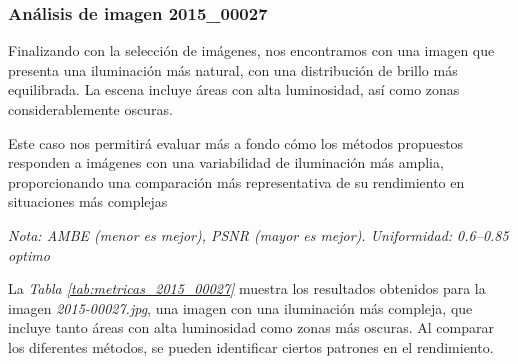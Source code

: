 \documentclass[sigchi]{acmart}
\begin{document}
\subsubsection{Análisis de imagen 2015\_00027}

Finalizando con la selección de imágenes, nos encontramos con una imagen que presenta una
iluminación más natural, con una distribución de brillo más equilibrada. La escena incluye
áreas con alta luminosidad, así como zonas considerablemente oscuras.

Este caso nos permitirá evaluar más a fondo cómo los métodos propuestos responden a imágenes
con una variabilidad de iluminación más amplia, proporcionando una comparación más
representativa de su rendimiento en situaciones más complejas

\begin{table}[H]
	\centering
	\caption{Métricas de calidad para la imagen 2015\_00027.jpg}
	\label{tab:metricas_2015_00027}
	\vspace{0.5em}


	\vspace{0.5em}
	\footnotesize%
	\textit{Nota: AMBE (menor es mejor), PSNR (mayor es mejor). Uniformidad: 0.6–0.85 optimo}
\end{table}

La \emph{Tabla \ref{tab:metricas_2015_00027}} muestra los resultados obtenidos para la imagen
\emph{2015-00027.jpg}, una imagen con una iluminación más compleja, que incluye tanto áreas con alta
luminosidad como zonas más oscuras. Al comparar los diferentes métodos, se pueden identificar
ciertos patrones en el rendimiento.
\end{document}
